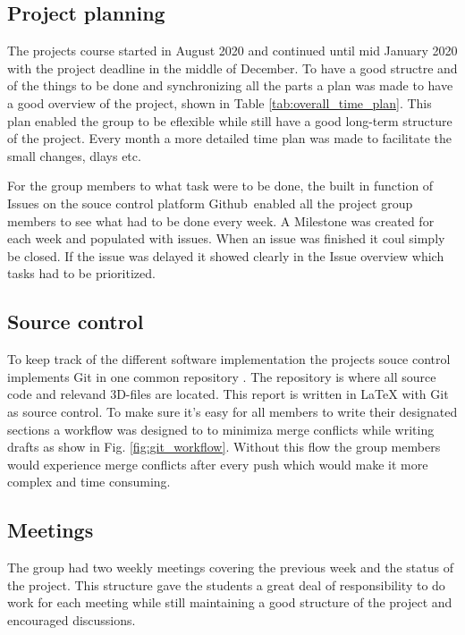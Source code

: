 
\subsection{Project planning}
The projects course started in August 2020 and continued until mid January 2020 with the project deadline in the middle of December. To have a good structre and of the things to be done and synchronizing all the parts a plan was made to have a good overview of the project, shown in Table \ref{tab:overall_time_plan}. This plan enabled the group to be eflexible while still have a good long-term structure of the project. Every month a more detailed time plan was made to facilitate the small changes, dlays etc. 

For the group members to what task were to be done, the built in function of Issues on the souce control platform Github\textregistered \ enabled all the project group members to see what had to be done every week. A Milestone was created for each week and populated with issues. When an issue was finished it coul simply be closed. If the issue was delayed it showed clearly in the Issue overview which tasks had to be prioritized. 

\subsection{Source control}
To keep track of the different software implementation the projects souce control implements Git in one common repository \cite{repo}. The repository is where all source code and relevand 3D-files are located. This report is written in LaTeX with Git as source control. To make sure it's easy for all members to write their designated sections a workflow was designed to to minimiza merge conflicts while writing drafts as show in Fig. \ref{fig:git_workflow}. Without this flow the group members would experience merge conflicts after every push which would make it more complex and time consuming. 



\subsection{Meetings}
The group had two weekly meetings covering the previous week and the status of the project. This structure gave the students a great deal of responsibility to do work for each meeting while still maintaining a good structure of the project and encouraged discussions. 